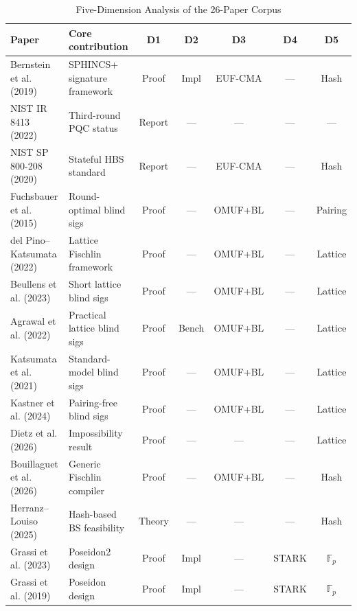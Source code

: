 \documentclass[11pt,a4paper]{article}
\newcommand{\Fp}{\mathbb{F}_p}
\begin{document}
\begin{table}[t]
\centering
\caption{Five-Dimension Analysis of the 26-Paper Corpus}
\label{tab:dimension}
\footnotesize
\begin{tabularx}{\textwidth}{l>{\raggedright\arraybackslash}p{2.8cm}ccccc}
\toprule
\textbf{Paper} & \textbf{Core contribution} & \textbf{D1} & \textbf{D2} & \textbf{D3} & \textbf{D4} & \textbf{D5} \\
\midrule
Bernstein et al. (2019) \cite{Bernstein2019SPHINCS} & SPHINCS+ signature framework & Proof & Impl & EUF-CMA & --- & Hash \\
NIST IR 8413 (2022) \cite{NIST2022IR8413} & Third-round PQC status & Report & --- & --- & --- & --- \\
NIST SP 800-208 (2020) \cite{NIST2020SP800} & Stateful HBS standard & Report & --- & EUF-CMA & --- & Hash \\
Fuchsbauer et al. (2015) \cite{Fuchsbauer2015Practical} & Round-optimal blind sigs & Proof & --- & OMUF+BL & --- & Pairing \\
del Pino--Katsumata (2022) \cite{delPino2022Framework} & Lattice Fischlin framework & Proof & --- & OMUF+BL & --- & Lattice \\
Beullens et al. (2023) \cite{Beullens2023LatticeBlind} & Short lattice blind sigs & Proof & --- & OMUF+BL & --- & Lattice \\
Agrawal et al. (2022) \cite{Agrawal2022Practical} & Practical lattice blind sigs & Proof & Bench & OMUF+BL & --- & Lattice \\
Katsumata et al. (2021) \cite{Katsumata2021} & Standard-model blind sigs & Proof & --- & OMUF+BL & --- & Lattice \\
Kastner et al. (2024) \cite{Kastner2024PairingFree} & Pairing-free blind sigs & Proof & --- & OMUF+BL & --- & Lattice \\
Dietz et al. (2026) \cite{Dietz2026Impossibility} & Impossibility result & Proof & --- & --- & --- & Lattice \\
Bouillaguet et al. (2026) \cite{Bouillaguet2026BlindingPH} & Generic Fischlin compiler & Proof & --- & OMUF+BL & --- & Hash \\
Herranz--Louiso (2025) \cite{Herranz2025HashBased} & Hash-based BS feasibility & Theory & --- & --- & --- & Hash \\
Grassi et al. (2023) \cite{Grassi2023Poseidon2} & Poseidon2 design & Proof & Impl & --- & STARK & $\Fp$ \\
Grassi et al. (2019) \cite{Grassi2019Poseidon} & Poseidon design & Proof & Impl & --- & STARK & $\Fp$ \\

\end{tabularx}
\end{table}
\end{document}
